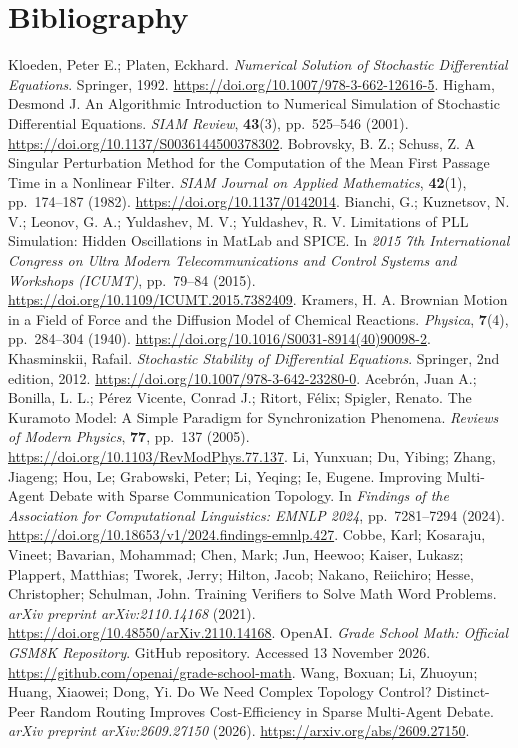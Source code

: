\documentclass[11pt,a4paper]{article}
\makeatletter
\renewenvironment{thebibliography}[1]
{\section{Bibliography}\list{\@biblabel{\@arabic\c@enumiv}}
{\usecounter{enumiv}\setlength{\leftmargin}{2em}\setlength{\labelwidth}{1.5em}\setlength{\labelsep}{.5em}}\sloppy}
{\endlist}
\makeatother
\begin{document}
\clearpage
\begin{thebibliography}{11}
 Kloeden, Peter E.; Platen, Eckhard. \emph{Numerical Solution of Stochastic Differential Equations}. Springer, 1992. \url{https://doi.org/10.1007/978-3-662-12616-5}.
 Higham, Desmond J. An Algorithmic Introduction to Numerical Simulation of Stochastic Differential Equations. \emph{SIAM Review}, \textbf{43}(3), pp.~525--546 (2001). \url{https://doi.org/10.1137/S0036144500378302}.
 Bobrovsky, B. Z.; Schuss, Z. A Singular Perturbation Method for the Computation of the Mean First Passage Time in a Nonlinear Filter. \emph{SIAM Journal on Applied Mathematics}, \textbf{42}(1), pp.~174--187 (1982). \url{https://doi.org/10.1137/0142014}.
 Bianchi, G.; Kuznetsov, N. V.; Leonov, G. A.; Yuldashev, M. V.; Yuldashev, R. V. Limitations of {PLL} Simulation: Hidden Oscillations in {MatLab} and {SPICE}. In \emph{2015 7th International Congress on Ultra Modern Telecommunications and Control Systems and Workshops (ICUMT)}, pp.~79--84 (2015). \url{https://doi.org/10.1109/ICUMT.2015.7382409}.
 Kramers, H. A. Brownian Motion in a Field of Force and the Diffusion Model of Chemical Reactions. \emph{Physica}, \textbf{7}(4), pp.~284--304 (1940). \url{https://doi.org/10.1016/S0031-8914(40)90098-2}.
 Khasminskii, Rafail. \emph{Stochastic Stability of Differential Equations}. Springer, 2nd edition, 2012. \url{https://doi.org/10.1007/978-3-642-23280-0}.
 Acebr{\'o}n, Juan A.; Bonilla, L. L.; P{\'e}rez Vicente, Conrad J.; Ritort, F{\'e}lix; Spigler, Renato. The {Kuramoto} Model: A Simple Paradigm for Synchronization Phenomena. \emph{Reviews of Modern Physics}, \textbf{77}, pp.~137 (2005). \url{https://doi.org/10.1103/RevModPhys.77.137}.
 Li, Yunxuan; Du, Yibing; Zhang, Jiageng; Hou, Le; Grabowski, Peter; Li, Yeqing; Ie, Eugene. Improving Multi-Agent Debate with Sparse Communication Topology. In \emph{Findings of the Association for Computational Linguistics: EMNLP 2024}, pp.~7281--7294 (2024). \url{https://doi.org/10.18653/v1/2024.findings-emnlp.427}.
 Cobbe, Karl; Kosaraju, Vineet; Bavarian, Mohammad; Chen, Mark; Jun, Heewoo; Kaiser, Lukasz; Plappert, Matthias; Tworek, Jerry; Hilton, Jacob; Nakano, Reiichiro; Hesse, Christopher; Schulman, John. Training Verifiers to Solve Math Word Problems. \emph{arXiv preprint arXiv:2110.14168} (2021). \url{https://doi.org/10.48550/arXiv.2110.14168}.
 {OpenAI}. \emph{Grade School Math: Official {GSM8K} Repository}. GitHub repository. Accessed 13 November 2026. \url{https://github.com/openai/grade-school-math}.
 Wang, Boxuan; Li, Zhuoyun; Huang, Xiaowei; Dong, Yi. Do We Need Complex Topology Control? Distinct-Peer Random Routing Improves Cost-Efficiency in Sparse Multi-Agent Debate. \emph{arXiv preprint arXiv:2609.27150} (2026). \url{https://arxiv.org/abs/2609.27150}.
\end{thebibliography}
\end{document}
